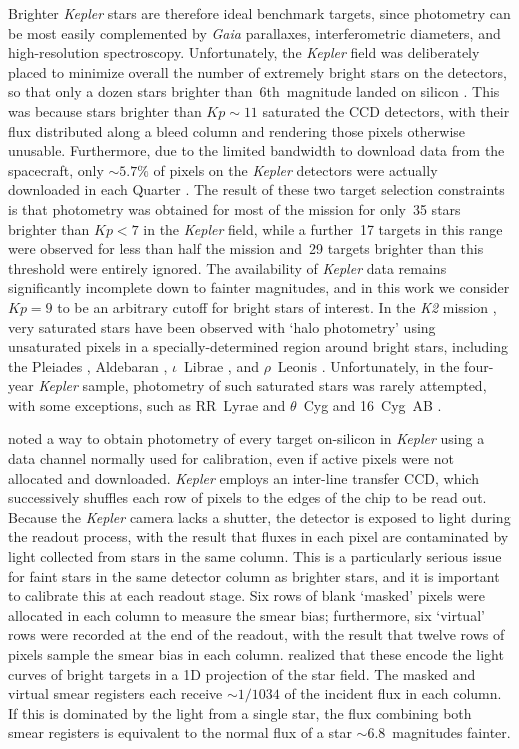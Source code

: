 \documentclass[modern]{aastex62}
\newcommand{\kepler}{\textit{Kepler}\xspace}
\newcommand{\ktwo}{\textit{K2}\xspace}
\newcommand{\gaia}{\textit{Gaia}\xspace}
\begin{document}
Brighter \kepler stars are therefore ideal benchmark targets, since photometry can be most easily complemented by \gaia parallaxes, interferometric diameters, and high-resolution spectroscopy.  
Unfortunately, the \kepler field was deliberately placed to minimize overall the number of extremely bright stars on the detectors, so that only a dozen stars brighter than~6th~magnitude landed on silicon \citep{2010ApJ...713L..79K}. This was because stars brighter than $Kp \sim 11$ saturated the CCD detectors, with their flux distributed along a bleed column and rendering those pixels otherwise unusable. Furthermore, due to the limited bandwidth to download data from the spacecraft, only $\sim 5.7\%$ of pixels on the \kepler detectors were actually downloaded in each Quarter \citep{2010ApJ...713L..87J}. The result of these two target selection constraints is that photometry was obtained for most of the mission for only~35 stars brighter than $Kp<7$ in the \kepler field, while a further~17 targets in this range were observed for less than half the mission and~29 targets brighter than this threshold were entirely ignored. The availability of \kepler data remains significantly incomplete down to fainter magnitudes, and in this work we consider $Kp=9$ to be an arbitrary cutoff for bright stars of interest. In the \ktwo mission \citep{k2early}, very saturated stars have been observed with `halo photometry' using unsaturated pixels in a specially-determined region around bright stars, including the Pleiades \citep{halo}, Aldebaran \citep{aldebaran}, $\iota$~Librae \citep{Buysschaert2018}, and $\rho$~Leonis \citep{rholeo}. Unfortunately, in the four-year \kepler sample, photometry of such saturated stars was rarely attempted, with some exceptions, such as RR~Lyrae \citep{Kolenberg2011} and $\theta$~Cyg and 16~Cyg~AB \citep[e.g.][]{thetacygwhite,Guzik2016}.

\citet{orig_smear} noted a way to obtain photometry of every target on-silicon in \kepler using a data channel normally used for calibration, even if active pixels were not allocated and downloaded. \kepler employs an inter-line transfer CCD, which successively shuffles each row of pixels to the edges of the chip to be read out. Because the \kepler camera lacks a shutter, the detector is exposed to light during the readout process, with the result that fluxes in each pixel are contaminated by light collected from stars in the same column. This is a particularly serious issue for faint stars in the same detector column as brighter stars, and it is important to calibrate this at each readout stage. Six rows of blank `masked' pixels were allocated in each column to measure the smear bias; furthermore, six `virtual' rows were recorded at the end of the readout, with the result that twelve rows of pixels sample the smear bias in each column. \citet{orig_smear} realized that these encode the light curves of bright targets in a 1D projection of the star field. The masked and virtual smear registers each receive $\sim 1/1034$ of the incident flux in each column. If this is dominated by the light from a single star, the flux combining both smear registers is equivalent to the normal flux of a star $\sim 6.8$~magnitudes fainter. 
\end{document}

